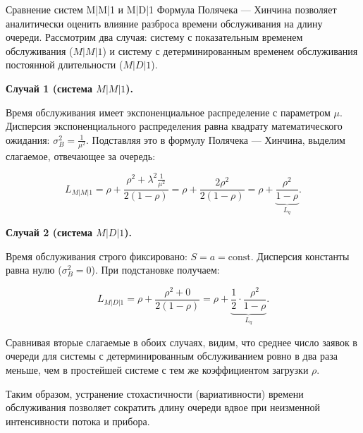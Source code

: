 \begin{example}{Сравнение систем M|M|1 и M|D|1}
Формула Полячека — Хинчина позволяет аналитически оценить влияние разброса времени обслуживания на длину очереди. Рассмотрим два случая: систему с показательным временем обслуживания ($M|M|1$) и систему с детерминированным временем обслуживания постоянной длительности ($M|D|1$).
\end{example}

\begin{eproof}

\textbf{Случай 1 (система $M|M|1$).}

Время обслуживания имеет экспоненциальное распределение с параметром $\mu$. Дисперсия экспоненциального распределения равна квадрату математического ожидания: $\sigma_B^2 = \frac{1}{\mu^2}$. Подставляя это в формулу Полячека — Хинчина, выделим слагаемое, отвечающее за очередь:

$$L_{M|M|1} = \rho + \frac{\rho^2 + \lambda^2 \frac{1}{\mu^2}}{2(1-\rho)} = \rho + \frac{2\rho^2}{2(1-\rho)} = \rho + \underbrace{\frac{\rho^2}{1-\rho}}_{L_q}.$$

\textbf{Случай 2 (система $M|D|1$).}

Время обслуживания строго фиксировано: $S = a = \text{const}$. Дисперсия константы равна нулю ($\sigma_B^2 = 0$). При подстановке получаем:

$$L_{M|D|1} = \rho + \frac{\rho^2 + 0}{2(1-\rho)} = \rho + \underbrace{\frac{1}{2} \cdot \frac{\rho^2}{1-\rho}}_{L_q}.$$

Сравнивая вторые слагаемые в обоих случаях, видим, что среднее число заявок в очереди для системы с детерминированным обслуживанием ровно в два раза меньше, чем в простейшей системе с тем же коэффициентом загрузки $\rho$.

Таким образом, устранение стохастичности (вариативности) времени обслуживания позволяет сократить длину очереди вдвое при неизменной интенсивности потока и прибора.
\end{eproof}

